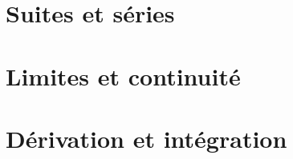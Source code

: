 \documentclass[a4paper, 10pt, twoside]{report}
\begin{document}

\theoremstyle{plain}


\chapter{Suites et séries}

    

\chapter{Limites et continuité}

    

\chapter{Dérivation et intégration}

    


%     
    

%     
        

%     


%     

\end{document}
